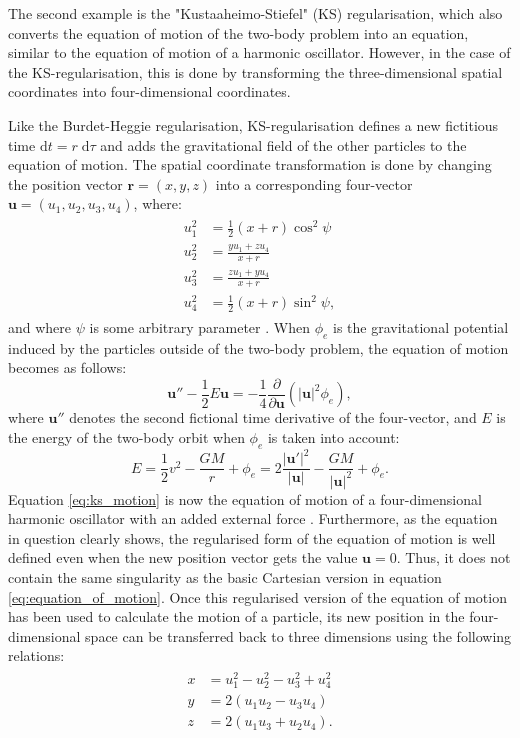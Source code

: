 \documentclass[english, twoside]{HYgradu}
\begin{document}
The second example is the "Kustaaheimo-Stiefel" (KS) regularisation, which also converts the equation of motion of the two-body problem into an equation, similar to the equation of motion of a harmonic oscillator. However, in the case of the KS-regularisation, this is done by transforming the three-dimensional spatial coordinates into four-dimensional coordinates. 

Like the Burdet-Heggie regularisation, KS-regularisation defines a new fictitious time $\mathrm{d}t = r \; \mathrm{d}\tau$ and adds the gravitational field of the other particles to the equation of motion. The spatial coordinate transformation is done by changing the position vector $\mathbf{r} = (x, y, z)$ into a corresponding four-vector $\mathbf{u} = (u_1, u_2, u_3, u_4)$, where:
\begin{align}
\begin{split}
u_1^2& = \frac{1}{2}(x+r)\cos^2\psi \\
u_2^2& = \frac{yu_1+zu_4}{x+r} \\
u_3^2& = \frac{zu_1+yu_4}{x+r} \\
u_4^2& = \frac{1}{2}(x+r)\sin^2\psi,
\end{split}
\end{align}
and where $\psi$ is some arbitrary parameter \citep{BinneyTremaine}. When $\phi_e$ is the gravitational potential induced by the particles outside of the two-body problem, the equation of motion becomes as follows:
\begin{equation}
\mathbf{u}'' - \frac{1}{2} E \mathbf{u} = -\frac{1}{4} \frac{\partial}{\partial\mathbf{u}} \left( |\mathbf{u}|^2 \phi_e \right), \label{eq:ks_motion}
\end{equation} 
where $\mathbf{u}''$ denotes the second fictional time derivative of the four-vector, and $E$ is the energy of the two-body orbit when $\phi_e$ is taken into account:
\begin{equation}
E = \frac{1}{2}v^2 - \frac{GM}{r} + \phi_e = 2 \frac{|\mathbf{u'}|^2}{|\mathbf{u}|} - \frac{GM}{|\mathbf{u}|^2} + \phi_e.
\end{equation}
Equation \ref{eq:ks_motion} is now the equation of motion of a four-dimensional harmonic oscillator with an added external force \citep{BinneyTremaine}. Furthermore, as the equation in question clearly shows, the regularised form of the equation of motion is well defined even when the new position vector gets the value $\mathbf{u} = 0$. Thus, it does not contain the same singularity as the basic Cartesian version in equation \ref{eq:equation_of_motion}. Once this regularised version of the equation of motion has been used to calculate the motion of a particle, its new position in the four-dimensional space can be transferred back to three dimensions using the following relations:
\begin{align}
\begin{split}
x &= u_1^2 - u_2^2 - u_3^2 + u_4^2 \\
y &= 2 \left( u_1 u_2 - u_3 u_4 \right) \\
z &= 2 \left( u_1 u_3 + u_2 u_4 \right).
\end{split}
\end{align}
\end{document}
